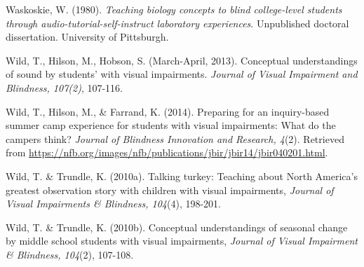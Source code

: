 \documentclass[11.5pt]{sig-alternate} %
\begin{document}
Waskoskie, W.  (1980).  \textit{Teaching biology concepts to blind college-level students through audio-tutorial-self-instruct laboratory experiences}.  Unpublished doctoral dissertation.  University of Pittsburgh.  

Wild, T., Hilson, M., Hobson, S.  (March-April, 2013).  Conceptual understandings of sound by students’ with visual impairments.  \textit{Journal of Visual Impairment and Blindness, 107(2)}, 107-116.

Wild, T., Hilson, M., \& Farrand, K. (2014). Preparing for an inquiry-based summer camp experience for students with visual impairments: What do the campers think? \textit{Journal of Blindness Innovation and Research, 4}(2). Retrieved from \url{https://nfb.org/images/nfb/publications/jbir/jbir14/jbir040201.html}.

Wild, T. \& Trundle, K. (2010a).  Talking turkey: Teaching about North America’s greatest observation story with children with visual impairments, \textit{Journal of Visual Impairments \& Blindness, 104}(4), 198-201.

Wild, T. \& Trundle, K.  (2010b).  Conceptual understandings of seasonal change by middle school students with visual impairments, \textit{Journal of Visual Impairment \& Blindness, 104}(2), 107-108.
\end{document}
